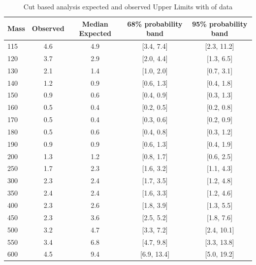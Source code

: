 \begin{table}
{\scriptsize
 \begin{center}
 \begin{tabular}{l| c c c c }
 \hline
Mass     &           Observed &   Median Expected   &      68\% probability band &   95\% probability band \\
 \hline
115  &   4.6  &           4.9 &   [3.4, 7.4]   &    [2.3, 11.2] \\
120  &   3.7  &           2.9 &   [2.0, 4.4]   &    [1.3, 6.5]  \\
130  &   2.1  &           1.4 &   [1.0, 2.0]   &    [0.7, 3.1]  \\
140  &   1.2  &           0.9 &   [0.6, 1.3]   &    [0.4, 1.8]  \\
150  &   0.9  &           0.6 &   [0.4, 0.9]   &    [0.3, 1.3]  \\
160  &   0.5  &           0.4 &   [0.2, 0.5]   &    [0.2, 0.8] \\ 
170  &   0.5  &           0.4 &   [0.3, 0.6]   &    [0.2, 0.9] \\ 
180  &   0.5  &           0.6 &   [0.4, 0.8]   &    [0.3, 1.2] \\ 
190  &   0.9  &           0.9 &   [0.6, 1.3]   &    [0.4, 1.9] \\ 
200  &   1.3  &           1.2 &   [0.8, 1.7]   &    [0.6, 2.5] \\ 
250  &   1.7  &           2.3 &   [1.6, 3.2]   &    [1.1, 4.3] \\ 
300  &   2.3  &           2.4 &   [1.7, 3.5]   &    [1.2, 4.8] \\ 
350  &   2.4  &           2.4 &   [1.6, 3.3]   &    [1.2, 4.6] \\ 
400  &   2.3  &           2.6 &   [1.8, 3.9]   &    [1.3, 5.5] \\ 
450  &   2.3  &           3.6 &   [2.5, 5.2]   &    [1.8, 7.6] \\ 
500  &   3.2  &           4.7 &   [3.3, 7.2]   &    [2.4, 10.1]\\ 
550  &   3.4  &           6.8 &   [4.7, 9.8]   &    [3.3, 13.8]\\ 
600  &   4.5  &           9.4 &   [6.9, 13.4]  &    [5.0, 19.2]\\
\hline
\end{tabular}
\end{center}
}
\caption{Cut based analysis expected and observed Upper Limits with \intlumi of data}
\label{tab:cut_limits_data}
\end{table}


